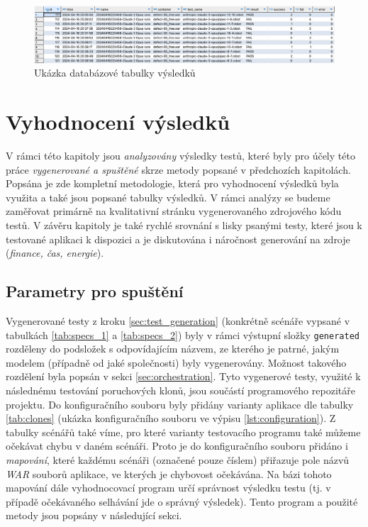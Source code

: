 \documentclass[czech, ma, kiv, he, iso690alph, pdf, viewonly]{fasthesis}
\begin{document}
    \begin{figure}
        \includegraphics[width=\textwidth]{pic/sqlite_example.png}
        \centering
        \caption{Ukázka databázové tabulky výsledků}
        \label{fig:sqlite_report}
    \end{figure}

\chapter{Vyhodnocení výsledků}

    V rámci této kapitoly jsou \emph{analyzovány} výsledky testů, které byly pro účely této práce \textit{vygenerované a spuštěné} skrze metody popsané v předchozích kapitolách. Popsána je zde kompletní metodologie, která pro vyhodnocení výsledků byla využita a také jsou popsané tabulky výsledků. V rámci analýzy se budeme zaměřovat primárně na kvalitativní stránku vygenerovaného zdrojového kódu testů. V závěru kapitoly je také rychlé srovnání s lisky psanými testy, které jsou k testované aplikaci k dispozici a je diskutována i náročnost generování na zdroje (\textit{finance, čas, energie}).

    \section{Parametry pro spuštění} \label{sec:run_parameters}

    Vygenerované testy z kroku \ref{sec:test_generation} (konkrétně scénáře vypsané v tabulkách \ref{tab:specs_1} a \ref{tab:specs_2}) byly v rámci výstupní složky \verb|generated| rozděleny do podsložek s odpovídajícím názvem, ze kterého je patrné, jakým modelem (případně od jaké společnosti) byly vygenerovány. Možnost takového rozdělení byla popsán v sekci \ref{sec:orchestration}. Tyto vygenerové testy, využité k následnému testování poruchových klonů, jsou součástí programového repozitáře projektu. Do konfiguračního souboru byly přidány varianty aplikace dle tabulky \ref{tab:clones} (ukázka konfiguračního souboru ve výpisu \ref{lst:configuration}). Z tabulky scénářů také víme, pro které varianty testovacího programu také můžeme očekávat chybu v daném scénáři. Proto je do konfiguračního souboru přidáno i \textit{mapování}, které každému scénáři (označené pouze číslem) přiřazuje pole názvů \textit{WAR} souborů aplikace, ve kterých je chybovost očekávána. Na bázi tohoto mapování dále vyhodnocovací program určí správnost výsledku testu (tj. v případě očekávaného selhávání jde o správný výsledek). Tento program a použité metody jsou popsány v následující sekci.
\end{document}
